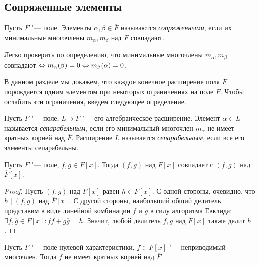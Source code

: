 \subsection{Сопряженные элементы}

\begin{definition}
	Пусть $F$ "--- поле. Элементы $\alpha, \beta \in \overline{F}$ называются \textit{сопряженными}, если их минимальные многочлены $m_\alpha, m_\beta$ над $F$ совпадают.
\end{definition}

\begin{note}
	Легко проверить по определению, что минимальные многочлены $m_\alpha, m_\beta$ совпадают $\Leftrightarrow m_\alpha(\beta) = 0 \Leftrightarrow m_\beta(\alpha) = 0$.
\end{note}

В данном разделе мы докажем, что каждое конечное расширение поля $F$ порождается одним элементом при некоторых ограничениях на поле $F$. Чтобы ослабить эти ограничения, введем следующее определение.

\begin{definition}
	Пусть $F$ "--- поле, $L \supset F$ "--- его алгебраическое расширение. Элемент $\alpha \in L$ называется \textit{сепарабельным}, если его минимальный многочлен $m_\alpha$ не имеет кратных корней над $\overline{F}$. Расширение $L$ называется \textit{сепарабельным}, если все его элементы сепарабельны.
\end{definition}

\begin{proposition}
	Пусть $F$ "--- поле, $f, g \in F[x]$. Тогда $(f, g)$ над $F[x]$ совпадает с $(f, g)$ над $\overline{F}[x]$.
\end{proposition}

\begin{proof}
	Пусть $(f, g)$ над $F[x]$ равен $h \in F[x]$. С одной стороны, очевидно, что $h \mid (f, g)$ над $\overline{F}[x]$. С другой стороны, наибольший общий делитель представим в виде линейной комбинации $f$ и $g$ в силу алгоритма Евклида: $\exists \overline{f}, \overline{g} \in F[x]: f\overline{f} + g\overline{g} = h$. Значит, любой делитель $f, g$ над $\overline{F}[x]$ также делит $h$.
\end{proof}

\begin{proposition}
	Пусть $F$ "--- поле нулевой характеристики, $f \in F[x]$ "--- неприводимый многочлен. Тогда $f$ не имеет кратных корней над $\overline{F}$.
\end{proposition}

